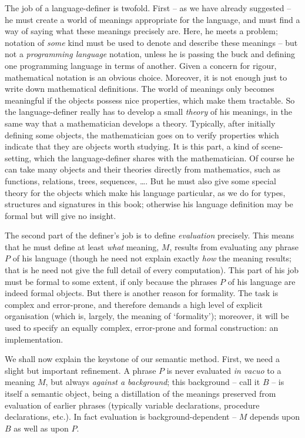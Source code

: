The job of a language-definer is twofold.  First -- as we have already 
suggested -- he must create a world of meanings appropriate for the language, 
and must find a way of saying
what these meanings precisely are.  Here, he meets a problem; notation
of {\sl some} kind must be used to denote and describe these meanings --
but not a {\sl programming language} notation, unless he is passing the
buck and defining one programming language in terms of another. Given
a concern for rigour, mathematical notation is an obvious choice.  Moreover, 
it is not enough just to
write down mathematical definitions. The world of meanings only becomes
meaningful if the objects possess nice properties, which make them tractable.
So the language-definer really has to develop a small {\sl theory} of his 
meanings, in the same way that a mathematician develops a theory.  
Typically, after initially defining some objects, the mathematician goes on to 
verify properties which indicate that they are objects worth studying. 
It is this part, a kind of scene-setting, which the language-definer shares 
with the 
mathematician.  Of course he can take many objects and their theories 
directly from mathematics,  such as functions, relations,
trees, sequences, \ldots. But he must also give some special theory for the
objects which make his language particular, as we do for types, structures and 
signatures in this book; otherwise his language definition may be 
formal but will give no insight.

The second part of the definer's job is to define {\sl evaluation} precisely.
This means that he must define at least {\sl what} meaning, $M$, results
from evaluating any phrase $P$ of his language (though he need not explain
exactly {\sl how} the meaning results; that is he need not give the full 
detail of every computation).  This part of his job must be formal
to some extent, if only because the phrases $P$ of his language are indeed
formal objects.  But there is another reason for formality.  The task is
complex and error-prone, and therefore demands a high level of explicit
organisation (which is, largely, the meaning of `formality'); moreover,
it will be used to specify an equally complex, error-prone and formal
construction: an implementation.

We shall now explain the keystone of our semantic method.  First, we need a
slight but important refinement. A phrase $P$ is never evaluated {\sl in
vacuo} to a meaning $M$, but always {\sl against a background}; this 
background -- call it $B$ -- is itself a semantic object, 
being a distillation of the meanings
preserved from evaluation of earlier phrases (typically variable declarations,
procedure declarations, etc.).  In fact evaluation is background-dependent
-- $M$ depends upon $B$ as well as upon $P$.   

